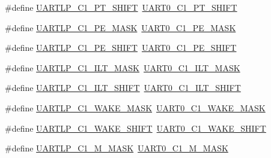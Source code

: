 \begin{DoxyCompactItemize}
\item 
\#define \hyperlink{group___backward___compatibility___symbols_ga97ce472c10fd61704932180dc3e26d51}{U\+A\+R\+T\+L\+P\+\_\+\+C1\+\_\+\+P\+T\+\_\+\+S\+H\+I\+FT}~\hyperlink{group___u_a_r_t0___register___masks_ga0e72f6045ea89531d37017231952256b}{U\+A\+R\+T0\+\_\+\+C1\+\_\+\+P\+T\+\_\+\+S\+H\+I\+FT}
\item 
\#define \hyperlink{group___backward___compatibility___symbols_ga23f4f361b83573abfc5cfd6f15ef3a89}{U\+A\+R\+T\+L\+P\+\_\+\+C1\+\_\+\+P\+E\+\_\+\+M\+A\+SK}~\hyperlink{group___u_a_r_t0___register___masks_ga7f5131b82519abb6471ec8054dc8ccef}{U\+A\+R\+T0\+\_\+\+C1\+\_\+\+P\+E\+\_\+\+M\+A\+SK}
\item 
\#define \hyperlink{group___backward___compatibility___symbols_gacce781ed7eeeb5e51a145dfec1848406}{U\+A\+R\+T\+L\+P\+\_\+\+C1\+\_\+\+P\+E\+\_\+\+S\+H\+I\+FT}~\hyperlink{group___u_a_r_t0___register___masks_gad8d18bd21ce855fe14fff0d932059faf}{U\+A\+R\+T0\+\_\+\+C1\+\_\+\+P\+E\+\_\+\+S\+H\+I\+FT}
\item 
\#define \hyperlink{group___backward___compatibility___symbols_ga0efd0cf26f2b583d1b21cc8cc3f487fe}{U\+A\+R\+T\+L\+P\+\_\+\+C1\+\_\+\+I\+L\+T\+\_\+\+M\+A\+SK}~\hyperlink{group___u_a_r_t0___register___masks_ga863c39adcb21a4547a5b9fcf85c06767}{U\+A\+R\+T0\+\_\+\+C1\+\_\+\+I\+L\+T\+\_\+\+M\+A\+SK}
\item 
\#define \hyperlink{group___backward___compatibility___symbols_ga337530c2b176d78ca6c28da4ab325783}{U\+A\+R\+T\+L\+P\+\_\+\+C1\+\_\+\+I\+L\+T\+\_\+\+S\+H\+I\+FT}~\hyperlink{group___u_a_r_t0___register___masks_gaa387ac068b517ea550833cc7353e25fe}{U\+A\+R\+T0\+\_\+\+C1\+\_\+\+I\+L\+T\+\_\+\+S\+H\+I\+FT}
\item 
\#define \hyperlink{group___backward___compatibility___symbols_ga2e69313a76db1ef757860afafa047a76}{U\+A\+R\+T\+L\+P\+\_\+\+C1\+\_\+\+W\+A\+K\+E\+\_\+\+M\+A\+SK}~\hyperlink{group___u_a_r_t0___register___masks_ga1c197c081ab6caac9a511196ca179a12}{U\+A\+R\+T0\+\_\+\+C1\+\_\+\+W\+A\+K\+E\+\_\+\+M\+A\+SK}
\item 
\#define \hyperlink{group___backward___compatibility___symbols_ga4ca5a7f2cdef379d91da768a34275930}{U\+A\+R\+T\+L\+P\+\_\+\+C1\+\_\+\+W\+A\+K\+E\+\_\+\+S\+H\+I\+FT}~\hyperlink{group___u_a_r_t0___register___masks_gab94505f50416420f95a9b016940fb956}{U\+A\+R\+T0\+\_\+\+C1\+\_\+\+W\+A\+K\+E\+\_\+\+S\+H\+I\+FT}
\item 
\#define \hyperlink{group___backward___compatibility___symbols_gaf7b253cfe0dae018953b5a5f7e696beb}{U\+A\+R\+T\+L\+P\+\_\+\+C1\+\_\+\+M\+\_\+\+M\+A\+SK}~\hyperlink{group___u_a_r_t0___register___masks_gabdd6ccef43f8d2a143ed2cbd16b94cf1}{U\+A\+R\+T0\+\_\+\+C1\+\_\+\+M\+\_\+\+M\+A\+SK}

\end{DoxyCompactItemize}
